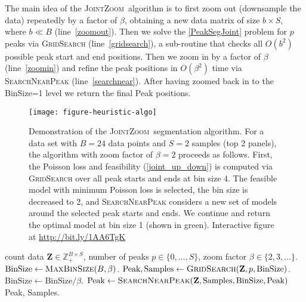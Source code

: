 \documentclass{article} %
\newcommand{\ZZ}{\mathbb Z}
\newcommand{\JointHeuristic}{\textsc{JointZoom}}
\begin{document}
The main idea of the \JointHeuristic\ algorithm is to first zoom out
(downsample the data) repeatedly by a factor of $\beta$, obtaining a
new data matrix of size $b\times S$, where $b \ll B$
(line~\ref{zoomout}). Then we solve the \ref{PeakSegJoint} problem for
$p$ peaks via \textsc{GridSearch} (line~\ref{gridsearch}), a
sub-routine that checks all $O(b^2)$ possible peak start and end
positions. Then we zoom in by a factor of $\beta$ (line~\ref{zoomin})
and refine the peak positions in $O(\beta^2)$ time via
\textsc{SearchNearPeak} (line~\ref{searchnear}). After having zoomed
back in to the BinSize=1 level we return the final Peak
positions. 

\begin{figure}[b!]
  \centering
  \texttt{[image: figure-heuristic-algo]}
  \vskip -0.5cm
  \caption{Demonstration of the \JointHeuristic\ segmentation
    algorithm. For a data set with $B=24$ data points and $S=2$
    samples (top 2 panels), the algorithm with zoom factor of
    $\beta=2$ proceeds as follows. First, the Poisson loss and
    feasibility (\ref{joint_up_down}) is computed via
    \textsc{GridSearch} over all peak starts and ends at bin size
    4. The feasible model with minimum Poisson loss is selected, the
    bin size is decreased to 2, and \textsc{SearchNearPeak} considers
    a new set of models around the selected peak starts and ends. We
    continue and return the optimal model at bin size 1 (shown in
    green). Interactive figure at \url{http://bit.ly/1AA6TgK}}
  \label{fig:heuristic-algo}
\end{figure}

\begin{algorithm}[H]
\begin{algorithmic}[1]
  \REQUIRE count data $\mathbf Z\in\ZZ_+^{B\times S}$, number of
  peaks $p\in\{0, \dots, S\}$, zoom factor
  $\beta\in\{2, 3, \dots\}$.
  \STATE $\textrm{BinSize} \gets \textsc{MaxBinSize}(B, \beta)$. \label{zoomout}
  \STATE $\textrm{Peak}, \textrm{Samples} \gets \label{gridsearch}
  \textsc{GridSearch}(\mathbf Z, p, \textrm{BinSize})$.
  \STATE $\textrm{BinSize} \gets \textrm{BinSize} / \beta$. \label{zoomin}
  \STATE $\textrm{Peak} \gets
  \textsc{SearchNearPeak}(\mathbf Z, \textrm{Samples}, \label{searchnear}
  \textrm{BinSize}, \textrm{Peak})$
  \ENDWHILE
  \RETURN Peak, Samples.
  \caption{\JointHeuristic, available at
    \url{https://github.com/tdhock/PeakSegJoint}}
\end{algorithmic}\label{algo}
\end{algorithm}
\end{document}
